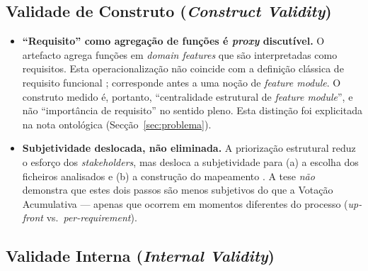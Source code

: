 \subsection{Validade de Construto (\emph{Construct Validity})}

\begin{itemize}
    \item \textbf{``Requisito'' como agregação de funções é
        \emph{proxy} discutível.} O artefacto 
        agrega funções em \emph{domain features} que são
        interpretadas como requisitos. Esta operacionalização não
        coincide com a definição clássica de requisito funcional
        \parencite{sommerville2007}; corresponde antes a uma noção
        de \emph{feature module}. O construto medido é, portanto,
        ``centralidade estrutural de \emph{feature module}'', e não
        ``importância de requisito'' no sentido pleno. Esta
        distinção foi explicitada na nota ontológica
        (Secção~\ref{sec:problema}).

    \item \textbf{Subjetividade deslocada, não eliminada.} A
        priorização estrutural reduz o esforço dos
        \emph{stakeholders}, mas desloca a subjetividade para (a) a
        escolha dos ficheiros analisados e (b) a construção do
        mapeamento . A tese
        \emph{não} demonstra que estes dois passos são menos
        subjetivos do que a Votação Acumulativa --- apenas que
        ocorrem em momentos diferentes do processo (\emph{up-front}
        vs.\ \emph{per-requirement}).
\end{itemize}

\subsection{Validade Interna (\emph{Internal Validity})}

